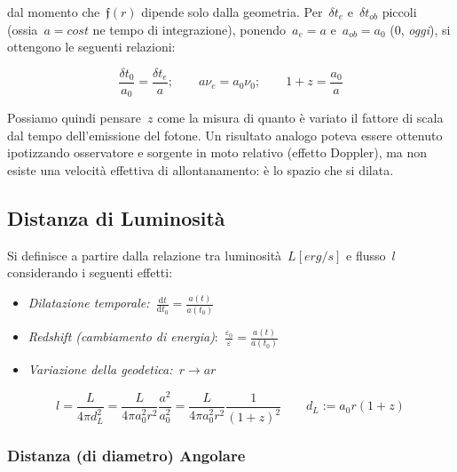dal momento che~\(\mathfrak{f}(r)\) dipende solo dalla geometria.
Per~\(\delta t_{e}\) e~\(\delta t_{ob}\) piccoli
(ossia~\(a=cost\) ne tempo di integrazione),
ponendo~\(a_e=a\) e~\(a_{ob}=a_0\) (0, \emph{oggi}), si
ottengono le seguenti relazioni:

\begin{equation}
\frac{\delta t_0}{a_0}=\frac{\delta t_e}{a};\qquad a\nu_e=a_0\nu_0;\qquad 1+z=\frac{a_0}{a}
\end{equation}

Possiamo quindi pensare~\(z\) come la misura di quanto è
variato il fattore di scala dal tempo dell'emissione del fotone. Un
risultato analogo poteva essere ottenuto ipotizzando osservatore e
sorgente in moto relativo (effetto Doppler), ma non esiste una velocità
effettiva di allontanamento: è lo spazio che si dilata.


\subsection{Distanza di Luminosità}

Si definisce a partire dalla relazione tra luminosità~\(L [erg/s]\)
e flusso~\(l\) considerando i seguenti effetti:

\begin{itemize}
\tightlist
\item
  \emph{Dilatazione temporale:~\(\frac{\mathrm{d}t}{\mathrm{d}t_0}=\frac{a(t)}{a(t_0)}\)}
\item
  \emph{Redshift (cambiamento di energia)}:~\(\frac{\varepsilon_0}{\varepsilon}=\frac{a(t)}{a(t_0)}\)
\end{itemize}

\begin{itemize}
\tightlist
\item
  \emph{Variazione della geodetica:~\(r\rightarrow ar\)}
\end{itemize}

\par\null

\begin{equation}
l=\frac{L}{4\pi d_L^2}=\frac{L}{4\pi a_0^2r^2}\frac{a^2}{a_0^2}=\frac{L}{4\pi a_0^2r^2}\frac{1}{(1+z)^2}\qquad d_L := a_0 r (1+z)
\end{equation}

\subsubsection*{Distanza (di diametro)
Angolare}

